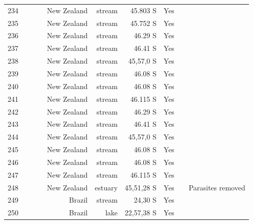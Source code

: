 \documentclass[12pt]{article}
\begin{document}
\begin{landscape}
\begin{table}[h!]
\begin{tabular}{rrrrrrrrr}
      234   & ~\citet{GlobalWeb} & ~\citet{Thompson2004c} & New Zealand & stream & 45.803 S & Yes   &       &  \\
      235   & ~\citet{GlobalWeb} & ~\citet{Thompson2004c} & New Zealand & stream & 45.752 S & Yes   &       &  \\
      236   & ~\citet{GlobalWeb} & ~\citet{Thompson2004c} & New Zealand & stream & 46.29 S & Yes   &       &  \\
      237   & ~\citet{GlobalWeb} & ~\citet{Thompson2004c} & New Zealand & stream & 46.41 S & Yes   &       &  \\
      238   & ~\citet{GlobalWeb} & ~\citet{Thompson2004c} & New Zealand & stream & 45,57,0 S & Yes   &       &  \\
      239   & ~\citet{GlobalWeb} & ~\citet{Thompson2004c} & New Zealand & stream & 46.08 S & Yes   &       &  \\
      240   & ~\citet{GlobalWeb} & ~\citet{Thompson2004c} & New Zealand & stream & 46.08 S & Yes   &       &  \\
      241   & ~\citet{GlobalWeb} & ~\citet{Thompson2004c} & New Zealand & stream & 46.115 S & Yes   &       &  \\
      242   & ~\citet{GlobalWeb} & ~\citet{Thompson2004c} & New Zealand & stream & 46.29 S & Yes   &       &  \\
      243   & ~\citet{GlobalWeb} & ~\citet{Thompson2004c} & New Zealand & stream & 46.41 S & Yes   &       &  \\
      244   & ~\citet{GlobalWeb} & ~\citet{Thompson2004c} & New Zealand & stream & 45,57,0 S & Yes   &       &  \\
      245   & ~\citet{GlobalWeb} & ~\citet{Thompson2004c} & New Zealand & stream & 46.08 S & Yes   &       &  \\
      246   & ~\citet{GlobalWeb} & ~\citet{Thompson2004c} & New Zealand & stream & 46.08 S & Yes   &       &  \\
      247   & ~\citet{GlobalWeb} & ~\citet{Thompson2004c} & New Zealand & stream & 46.115 S & Yes   &       &  \\
      248   & ~\citet{GlobalWeb} & ~\citet{Thompson2004} & New Zealand & estuary & 45,51,28 S & Yes   &       & Parasites removed \\
      249   & ~\citet{GlobalWeb} & ~\citet{Angelini2005} & Brazil & stream & 24,30 S & Yes   &       &  \\
      250   & ~\citet{GlobalWeb} & ~\citet{Angelini2006} & Brazil & lake  & 22,57,38 S & Yes   &       &  \\

\end{tabular}
\end{table}
\end{landscape}
\end{document}
